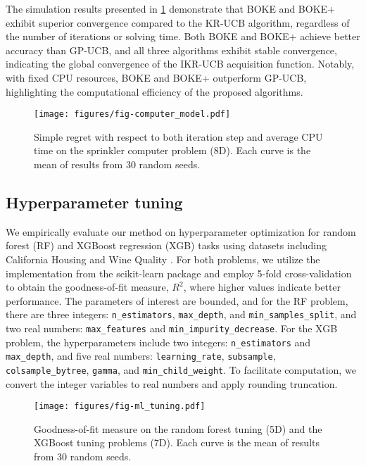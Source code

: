 \documentclass[11pt,en]{elegantpaper}
\newcommand{\1}{\mathds{1}}
\begin{document}
The simulation results presented in \cref{fig:sprinkler} demonstrate that BOKE and BOKE+ exhibit superior convergence compared to the KR-UCB algorithm, regardless of the number of iterations or solving time. Both BOKE and BOKE+ achieve better accuracy than GP-UCB, and all three algorithms exhibit stable convergence, indicating the global convergence of the IKR-UCB acquisition function. Notably, with fixed CPU resources, BOKE and BOKE+ outperform GP-UCB, highlighting the computational efficiency of the proposed algorithms.

\begin{figure}[!htb]
    \centering
    \texttt{[image: figures/fig-computer\_model.pdf]}
    \caption{
        Simple regret with respect to both iteration step and average CPU time on the sprinkler computer problem (8D).
        Each curve is the mean of results from 30 random seeds.
    }
    \label{fig:sprinkler}
\end{figure}




\subsection{Hyperparameter tuning}

We empirically evaluate our method on hyperparameter optimization for random forest (RF) and XGBoost regression (XGB) tasks using datasets including California Housing \cite{pace1997sparse} and Wine Quality \cite{cortez2009modeling}.
For both problems, we utilize the implementation from the scikit-learn package and employ 5-fold cross-validation to obtain the goodness-of-fit measure, $R^2$, where higher values indicate better performance.
The parameters of interest are bounded, and for the RF problem, there are three integers: \texttt{n\_estimators}, \texttt{max\_depth}, and \texttt{min\_samples\_split}, and two real numbers: \texttt{max\_features} and \texttt{min\_impurity\_decrease}.
For the XGB problem, the hyperparameters include two integers: \texttt{n\_estimators} and \texttt{max\_depth}, and five real numbers: \texttt{learning\_rate}, \texttt{subsample}, \texttt{colsample\_bytree}, \texttt{gamma}, and \texttt{min\_child\_weight}.
To facilitate computation, we convert the integer variables to real numbers and apply rounding truncation.


\begin{figure}[!htb]
    \centering
    \texttt{[image: figures/fig-ml\_tuning.pdf]}
    \caption{
        Goodness-of-fit measure on the random forest tuning (5D) and the XGBoost tuning problems (7D).
        Each curve is the mean of results from 30 random seeds.
    }
    \label{fig:ml tuning}
\end{figure}
\end{document}

